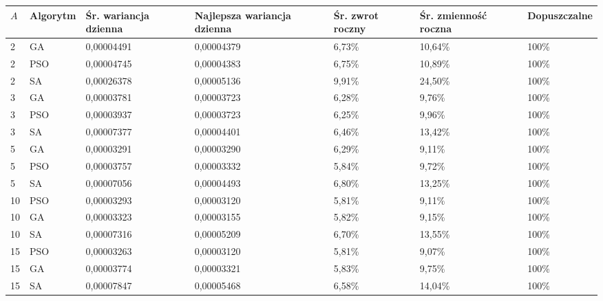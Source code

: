 \begin{tabular}{lllllll}
\toprule
$A$ & Algorytm & Śr. wariancja dzienna & Najlepsza wariancja dzienna & Śr. zwrot roczny & Śr. zmienność roczna & Dopuszczalne \\
\midrule
2 & GA & 0{,}00004491 & 0{,}00004379 & 6{,}73\% & 10{,}64\% & 100\% \\
2 & PSO & 0{,}00004745 & 0{,}00004383 & 6{,}75\% & 10{,}89\% & 100\% \\
2 & SA & 0{,}00026378 & 0{,}00005136 & 9{,}91\% & 24{,}50\% & 100\% \\
3 & GA & 0{,}00003781 & 0{,}00003723 & 6{,}28\% & 9{,}76\% & 100\% \\
3 & PSO & 0{,}00003937 & 0{,}00003723 & 6{,}25\% & 9{,}96\% & 100\% \\
3 & SA & 0{,}00007377 & 0{,}00004401 & 6{,}46\% & 13{,}42\% & 100\% \\
5 & GA & 0{,}00003291 & 0{,}00003290 & 6{,}29\% & 9{,}11\% & 100\% \\
5 & PSO & 0{,}00003757 & 0{,}00003332 & 5{,}84\% & 9{,}72\% & 100\% \\
5 & SA & 0{,}00007056 & 0{,}00004493 & 6{,}80\% & 13{,}25\% & 100\% \\
10 & PSO & 0{,}00003293 & 0{,}00003120 & 5{,}81\% & 9{,}11\% & 100\% \\
10 & GA & 0{,}00003323 & 0{,}00003155 & 5{,}82\% & 9{,}15\% & 100\% \\
10 & SA & 0{,}00007316 & 0{,}00005209 & 6{,}70\% & 13{,}55\% & 100\% \\
15 & PSO & 0{,}00003263 & 0{,}00003120 & 5{,}81\% & 9{,}07\% & 100\% \\
15 & GA & 0{,}00003774 & 0{,}00003321 & 5{,}83\% & 9{,}75\% & 100\% \\
15 & SA & 0{,}00007847 & 0{,}00005468 & 6{,}58\% & 14{,}04\% & 100\% \\
\bottomrule
\end{tabular}
